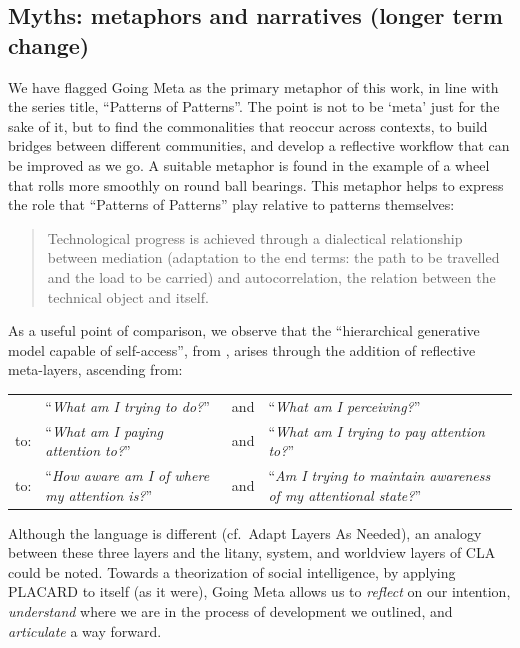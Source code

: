 \documentclass[acmlarge,timestamp]{acmart}
\begin{document}
\subsection{Myths: metaphors and narratives (longer term change)}
We have flagged {\sc Going Meta} as the primary metaphor of this work,
in line with the series title, “Patterns of Patterns”.  The point is
not to be ‘meta’ just for the sake of it, but to find the
commonalities that reoccur across contexts, to build bridges between
different communities, and develop a reflective workflow that can be
improved as we go.  A suitable metaphor is found in the example of a
wheel that rolls more smoothly on round ball bearings.  This metaphor
helps to express the role that “Patterns of Patterns” play relative to
patterns themselves:
\begin{quote}
Technological progress is achieved through a dialectical relationship
between mediation (adaptation to the end terms: the path to be
travelled and the load to be carried) and autocorrelation, the
relation between the technical object and
itself. \cite{Simondon2005-pq}
\end{quote}
As a useful point of comparison, we observe that the “hierarchical
generative model capable of self-access”, from
\citet{albarracin2023designing}, arises through the addition of
reflective meta-layers, ascending from:

{
\renewcommand*{\arraystretch}{1.2}
\begin{tabular}{lllp{}}
  &``\emph{What am I trying to do?}''&and&``\emph{What am I perceiving?}''\\
to:&``\emph{What am I paying attention to?}''&and&``\emph{What am I trying to pay attention to?}''\\
to:&``\emph{How aware am I of where my attention is?}''&and&``\emph{Am I trying to maintain awareness of my \phantom{X} attentional state?}''
\end{tabular}
}

\medskip
\noindent Although the language is different (cf.~{\sc Adapt Layers As
  Needed}), an analogy between these three layers and the litany,
system, and worldview layers of CLA could be noted.  Towards a
theorization of social intelligence, by applying PLACARD to itself (as
it were), {\sc Going Meta} allows us to \emph{reflect} on our
intention, \emph{understand} where we are in the process of
development we outlined, and \emph{articulate} a way forward.


\renewcommand\bibname{References}
\renewcommand\refname{References}
\end{document}
